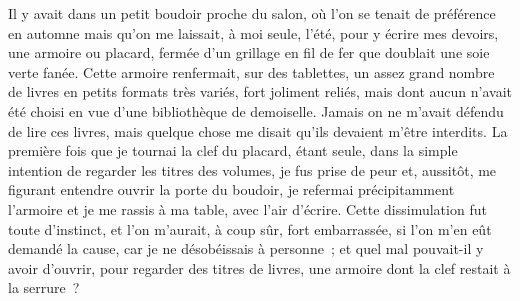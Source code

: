 	{
	
	Il y avait dans un petit boudoir proche du salon, où l'on se tenait de préférence en automne mais qu'on me laissait, à moi seule, l'été, pour y écrire mes devoirs, une armoire ou placard, fermée d'un grillage en fil de fer que doublait une soie verte fanée. Cette armoire renfermait, sur des tablettes, un assez grand nombre de livres en petits formats très variés, fort joliment reliés, mais dont aucun n'avait été choisi en vue d'une bibliothèque de demoiselle. Jamais on ne m'avait défendu de lire ces livres, mais quelque chose me disait qu'ils devaient m'être interdits. La première fois que je tournai la clef du placard, étant seule, dans la simple intention de regarder les titres des volumes, je fus prise de peur et, aussitôt, me figurant entendre ouvrir la porte du boudoir, je refermai précipitamment l'armoire et je me rassis à ma table, avec l'air d'écrire. Cette dissimulation fut toute d'instinct, et l'on m'aurait, à coup sûr, fort embarrassée, si l'on m'en eût demandé la cause, car je ne désobéissais à personne~; et quel mal pouvait-il y avoir d'ouvrir, pour regarder des titres de livres, une armoire dont la clef restait à la serrure~?
	
}
